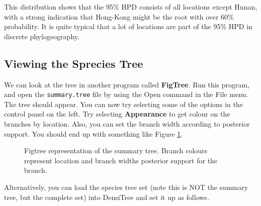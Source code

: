 \documentclass{article}
\begin{document}
This distribution shows that the 95\% HPD consists of all locations except Hunan, with a 
strong indication that Hong-Kong might be the root with over 60\% probability. It is quite
typical that a lot of locations are part of the 95\% HPD in discrete phylogeography.

\subsection*{Viewing the Sprecies Tree}

We can look at the tree in another program called {\bf FigTree}. Run this program, and open
the \texttt{summary.tree} file by using the Open command in the File menu. The tree should appear.
You can now try selecting some of the options in the control panel on the left. Try selecting
{\bf Appearance} to get colour on the branches by location. Also, you can set the branch width
according to posterior support. You should end up with something like Figure \ref{fig.figtree}.

\begin{figure}
\begin{center}


\end{center}
\caption{\label{fig.figtree} Figtree representation of the summary tree. Branch colours represent location
and branch widths posterior support for the branch.}
\end{figure}


Alternatively, you can load the species tree set (note this is NOT the summary tree, but the complete set) into DensiTree and set it up as follows.
\end{document}
